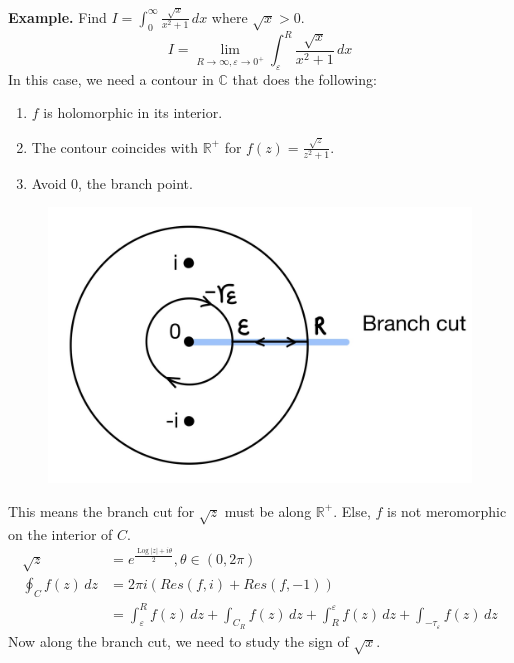 \documentclass[11pt]{article}
\begin{document}
\newline
\textbf{Example.} Find 
$I = \int_0^{\infty} \frac{\sqrt{x}}{x^2 + 1} \, dx$
where $\sqrt{x} > 0$.
$$ I = \lim_{R \to \infty, \varepsilon \to 0^+} \int_{\varepsilon}^R \frac{\sqrt{x}}{x^2 + 1} \, dx$$ 
In this case, we need a contour in $\mathbb{C}$ that does the following: 
\begin{enumerate}[leftmargin=*, nolistsep]
\item $f$ is holomorphic in its interior.
\item The contour coincides with $\mathbb{R}^+$ for $f(z) = \frac{\sqrt{z}}{z^2 + 1}$. 
\item Avoid 0, the branch point. 
\end{enumerate}
\begin{figure}[h]
\includegraphics[scale=0.15]{21_6} 
\centering
\end{figure} 
This means the branch cut for $\sqrt{z}$ must be along $\mathbb{R}^+$. Else, $f$ is not meromorphic on the interior of $C$. 
\begin{align*}
\sqrt{z} &= e^{\frac{\operatorname{Log}|z| + i\theta}{2}}, \theta \in (0, 2\pi) \\
\oint_Cf(z) \,dz &= 2\pi i\left(Res(f, i) + Res(f, -1)\right) \\
&= \int_{\varepsilon}^{R}f(z) \,dz + \int_{C_R}f(z) \,dz + \int_{R}^{\varepsilon} f(z) \,dz + \int_{-\tau_\varepsilon} f(z) \, dz
\end{align*}
Now along the branch cut, we need to study the sign of $\sqrt{x}$. 
\end{document}
